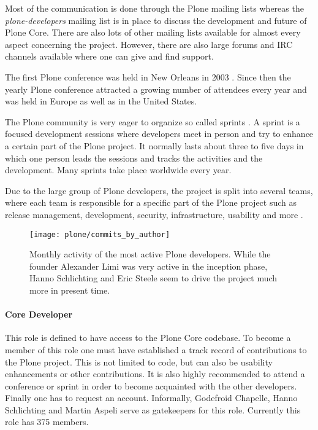 Most of the communication is done through the Plone mailing lists whereas the
\emph{plone-developers} mailing list is in place to discuss the development and
future of Plone Core. There are also lots of other mailing lists available for
almost every aspect concerning the project. However, there are also large
forums and \ac{IRC} channels available where one can give and find support.

The first Plone conference was held in New Orleans in 2003
\cite{PloneConferences}. Since then the yearly Plone conference attracted a
growing number of attendees every year and was held in Europe as well as in the
United States.

The Plone community is very eager to organize so called sprints
\cite{PloneSprints}. A sprint is a focused development sessions where
developers meet in person and try to enhance a certain part of the Plone
project. It normally lasts about three to five days in which one person leads
the sessions and tracks the activities and the development. Many sprints take
place worldwide every year.

Due to the large group of Plone developers, the project is split into several
teams, where each team is responsible for a specific part of the Plone project
such as release management, development, security, infrastructure, usability
and more
\cite{PloneFounders,PloneReleaseManagers,PloneFrameworkTeam,PloneContribute}.

\begin{figure}[thbp]
  \centering
  \texttt{[image: plone/commits\_by\_author]}
  \caption[Commits by Most Active Authors, Plone]
  {Monthly activity of the most active Plone developers. While the founder
    Alexander Limi was very active in the inception phase, Hanno Schlichting
    and Eric Steele seem to drive the project much more in present time.}
  \label{fig:plone:cba}
\end{figure}

\paragraph{Core Developer}

This role is defined to have access to the Plone Core codebase. To become a
member of this role one must have established a track record of contributions
to the Plone project. This is not limited to code, but can also be usability
enhancements or other contributions. It is also highly recommended to attend a
conference or sprint in order to become acquainted with the other developers.
Finally one has to request an account. Informally, Godefroid Chapelle, Hanno
Schlichting and Martin Aspeli serve as gatekeepers for this role. Currently
this role has 375 members.

